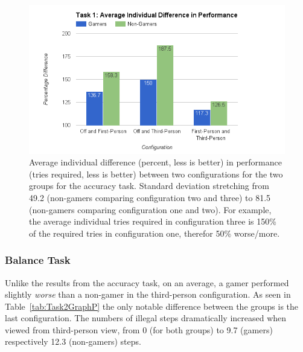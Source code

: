\documentclass[runningheads,a4paper,oribibl]{llncs}
\begin{document}
\begin{figure}
   \centering
   \includegraphics[width=\textwidth]{ExternalMaterial/Task1GraphD}
   \caption{Average individual difference (percent, less is better) in performance (tries required, less is better) between two configurations for the two groups for the accuracy task. Standard deviation stretching from 49.2 (non-gamers comparing configuration two and three) to 81.5 (non-gamers comparing configuration one and two). For example, the average individual tries required in configuration three is 150\% of the required tries in configuration one, therefor 50\% worse/more.} \label{fig:Task1GraphD}
\end{figure}












\subsubsection{Balance Task}
Unlike the results from the accuracy task, on an average, a gamer performed slightly \emph{worse} than a non-gamer in the third-person configuration. As seen in Table~\ref{tab:Task2GraphP} the only notable difference between the groups is the last configuration. The numbers of illegal steps dramatically increased when viewed from third-person view, from 0 (for both groups) to 9.7 (gamers) respectively 12.3 (non-gamers) steps.  
\end{document}

